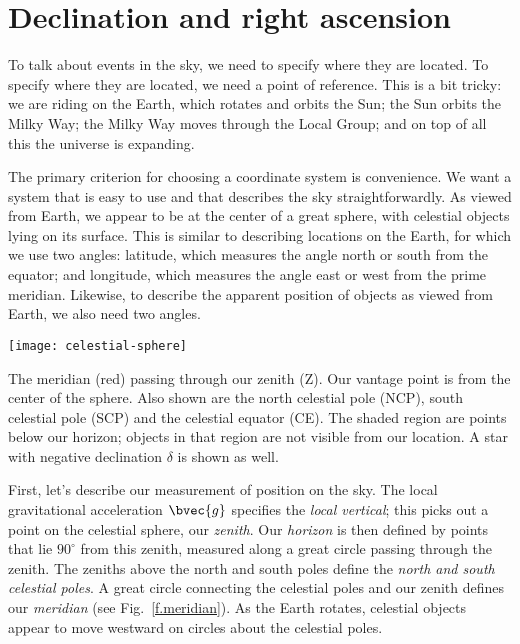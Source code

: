 
\section{Declination and right ascension}
To talk about events in the sky, we need to specify where they are located. To specify where they are located, we need a point of reference.  This is a bit tricky: we are riding on the Earth, which rotates and orbits the Sun; the Sun orbits the Milky Way; the Milky Way moves through the Local Group; and on top of all this the universe is expanding.

The primary criterion for choosing a coordinate system is convenience. We want a system that is easy to use and that describes the sky straightforwardly.
As viewed from Earth, we appear to be at the center of a great sphere, with celestial objects lying on its surface. This is similar to describing locations on the Earth, for which we use two angles: latitude, which measures the angle north or south from the equator; and longitude, which measures the angle east or west from the prime meridian.  Likewise, to describe the apparent position of objects as viewed from Earth, we also need two angles.

\begin{marginfigure}
\texttt{[image: celestial-sphere]}
\caption[The celestial sphere]{The meridian (red) passing through our zenith (Z).  Our vantage point is from the center of the sphere. Also shown are the north celestial pole (NCP), south celestial pole (SCP) and the celestial equator (CE).  The shaded region are points below our horizon; objects in that region are not visible from our location. A star with negative declination $\delta$ is shown as well.}
\label{f.meridian}
\end{marginfigure}

First, let's describe our measurement of position on the sky.
The local gravitational acceleration $\bvec{g}$ specifies the \emph{local vertical}; this picks out a point on the celestial sphere, our \emph{zenith}.  Our \emph{horizon} is then defined by points that lie $90^{\circ}$ from this zenith, measured along a great circle passing through the zenith.  The zeniths above the north and south poles define the \emph{north and south celestial poles}.  A great circle connecting the celestial poles and our zenith defines our \emph{meridian} (see Fig.~\ref{f.meridian}).  As the Earth rotates, celestial objects appear to move westward on circles about the celestial poles.  

